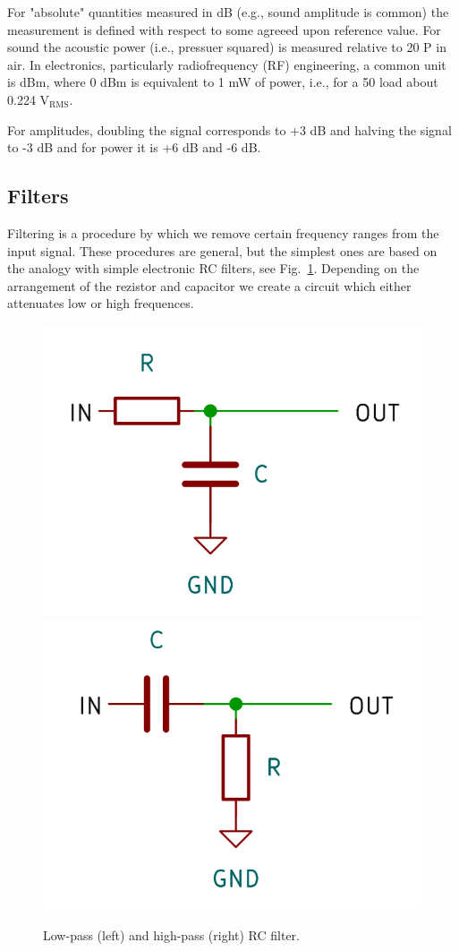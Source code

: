 For "absolute" quantities measured in dB (e.g., sound amplitude is common) the measurement is defined with respect to some agreeed upon reference value. For sound the acoustic power (i.e., pressuer squared) is measured relative to 20 \textmu P in air. In electronics, particularly radiofrequency (RF) engineering, a common unit is dBm, where 0 dBm is equivalent to 1 mW of power, i.e., for a 50 \textohm load about 0.224 V$_\mathrm{RMS}$.

For amplitudes, doubling the signal corresponds to +3 dB and halving the signal to -3 dB and for power it is +6 dB and -6 dB.

\subsection{Filters}

Filtering is a procedure by which we remove certain frequency ranges from the input signal. These procedures are general, but the simplest ones are based on the analogy with simple electronic RC filters, see Fig.~\ref{fig:RC-lowpass}. Depending on the arrangement of the rezistor and capacitor we create a circuit which either attenuates low or high frequences.
\begin{figure}
    \centering
    \includegraphics[width=0.49\linewidth]{low-pass-RC.png}%
    \includegraphics[width=0.49\linewidth]{high-pass-RC.png}%
    \label{fig:RC-lowpass}
    \caption{Low-pass (left) and high-pass (right) RC filter.}
\end{figure}

